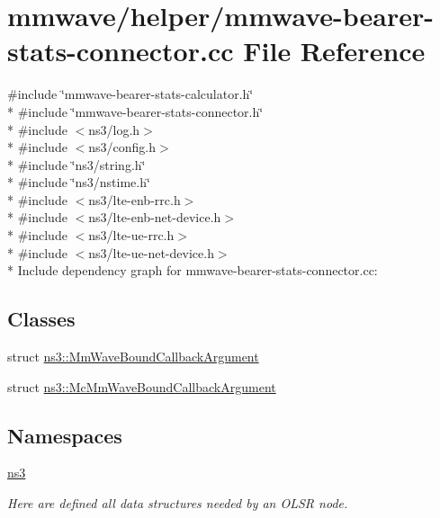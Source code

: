\hypertarget{mmwave-bearer-stats-connector_8cc}{}\section{mmwave/helper/mmwave-\/bearer-\/stats-\/connector.cc File Reference}
\label{mmwave-bearer-stats-connector_8cc}
{\ttfamily \#include \char`\"{}mmwave-\/bearer-\/stats-\/calculator.\+h\char`\"{}}\\*
{\ttfamily \#include \char`\"{}mmwave-\/bearer-\/stats-\/connector.\+h\char`\"{}}\\*
{\ttfamily \#include $<$ns3/log.\+h$>$}\\*
{\ttfamily \#include $<$ns3/config.\+h$>$}\\*
{\ttfamily \#include \char`\"{}ns3/string.\+h\char`\"{}}\\*
{\ttfamily \#include \char`\"{}ns3/nstime.\+h\char`\"{}}\\*
{\ttfamily \#include $<$ns3/lte-\/enb-\/rrc.\+h$>$}\\*
{\ttfamily \#include $<$ns3/lte-\/enb-\/net-\/device.\+h$>$}\\*
{\ttfamily \#include $<$ns3/lte-\/ue-\/rrc.\+h$>$}\\*
{\ttfamily \#include $<$ns3/lte-\/ue-\/net-\/device.\+h$>$}\\*
Include dependency graph for mmwave-\/bearer-\/stats-\/connector.cc\+:
\subsection*{Classes}
\begin{DoxyCompactItemize}
\item 
struct \hyperlink{structns3_1_1MmWaveBoundCallbackArgument}{ns3\+::\+Mm\+Wave\+Bound\+Callback\+Argument}
\item 
struct \hyperlink{structns3_1_1McMmWaveBoundCallbackArgument}{ns3\+::\+Mc\+Mm\+Wave\+Bound\+Callback\+Argument}
\end{DoxyCompactItemize}
\subsection*{Namespaces}
\begin{DoxyCompactItemize}
\item 
 \hyperlink{namespacens3}{ns3}
\begin{DoxyCompactList}\small\item\em Here are defined all data structures needed by an O\+L\+SR node. \end{DoxyCompactList}\end{DoxyCompactItemize}
